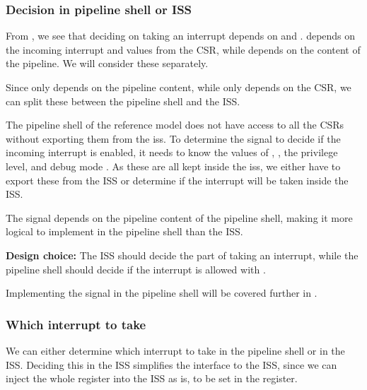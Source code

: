 \subsubsection{Decision in pipeline shell or ISS}


From , we see that deciding on taking an interrupt depends on  and .  depends on the incoming interrupt and values from the CSR, while  depends on the content of the pipeline. We will consider these separately.

Since only  depends on the pipeline content, while only  depends on the CSR, we can split these between the pipeline shell and the ISS.

The pipeline shell of the reference model does not have access to all the CSRs without exporting them from the \acrshort{iss}. To determine the  signal to decide if the incoming interrupt is enabled, it needs to know the values of , , the privilege level, and debug mode \cite{openhwgroupCv32e40s2024}. As these are all kept inside the \acrshort{iss}, we either have to export these from the ISS or determine if the interrupt will be taken inside the ISS. 

The  signal depends on the pipeline content of the pipeline shell, making it more logical to implement in the pipeline shell than the ISS.


\textbf{Design choice:} The ISS should decide the  part of taking an interrupt, while the pipeline shell should decide if the interrupt is allowed with .

Implementing the  signal in the pipeline shell will be covered further in .

\subsubsection{Which interrupt to take}

We can either determine which interrupt to take in the pipeline shell or in the ISS. Deciding this in the ISS simplifies the interface to the ISS, since we can inject the whole  register into the ISS as is, to be set in the  register. 

